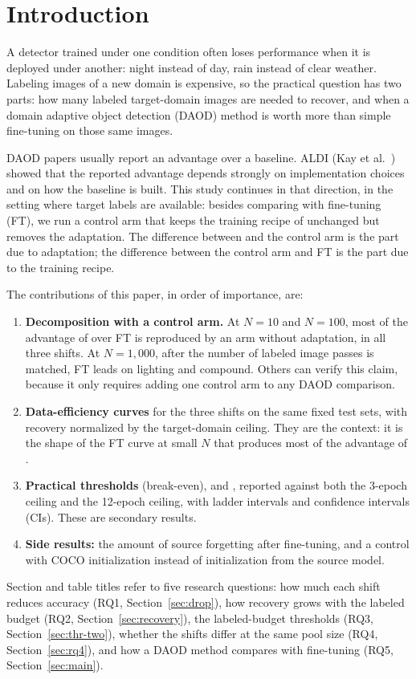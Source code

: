 
\section{Introduction}\label{sec:intro}

A detector trained under one condition often loses performance when it is deployed under another: night instead of day, rain instead of clear weather. Labeling images of a new domain is expensive, so the practical question has two parts: how many labeled target-domain images are needed to recover, and when a domain adaptive object detection (DAOD) method is worth more than simple fine-tuning on those same images.

DAOD papers usually report an advantage over a baseline. ALDI (Kay et al.~\cite{kay2024aldi}) showed that the reported advantage depends strongly on implementation choices and on how the baseline is built. This study continues in that direction, in the setting where target labels are available: besides comparing \aldi with fine-tuning (FT), we run a control arm that keeps the training recipe of \aldi unchanged but removes the adaptation. The difference between \aldi and the control arm is the part due to adaptation; the difference between the control arm and FT is the part due to the training recipe.

The contributions of this paper, in order of importance, are:
\begin{enumerate}
\item \textbf{Decomposition with a control arm.} At $N = 10$ and $N = 100$, most of the advantage of \aldi over FT is reproduced by an arm without adaptation, in all three shifts. At $N = 1{,}000$, after the number of labeled image passes is matched, FT leads on lighting and compound. Others can verify this claim, because it only requires adding one control arm to any DAOD comparison.
\item \textbf{Data-efficiency curves} for the three shifts on the same fixed test sets, with recovery normalized by the target-domain ceiling. They are the context: it is the shape of the FT curve at small $N$ that produces most of the advantage of \aldi.
\item \textbf{Practical thresholds} \NBE (break-even), \Nsf and \Nnf, reported against both the 3-epoch ceiling and the 12-epoch ceiling, with ladder intervals and confidence intervals (CIs). These are secondary results.
\item \textbf{Side results:} the amount of source forgetting after fine-tuning, and a control with COCO initialization instead of initialization from the source model.
\end{enumerate}
Section and table titles refer to five research questions: how much each shift reduces accuracy (RQ1, Section~\ref{sec:drop}), how recovery grows with the labeled budget (RQ2, Section~\ref{sec:recovery}), the labeled-budget thresholds (RQ3, Section~\ref{sec:thr-two}), whether the shifts differ at the same pool size (RQ4, Section~\ref{sec:rq4}), and how a DAOD method compares with fine-tuning (RQ5, Section~\ref{sec:main}).

